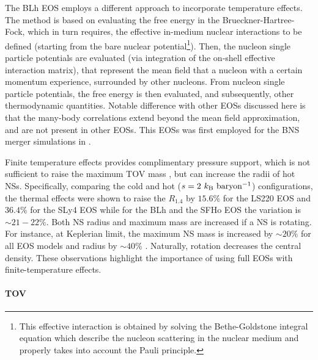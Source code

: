 The BLh \ac{EOS} employs a different approach to incorporate temperature effects.
The method is based on evaluating the free energy in the Brueckner-Hartree-Fock, which in turn requires,
the effective in-medium nuclear interactions to be defined (starting from the bare nuclear potential\footnote{
    This effective interaction is obtained by solving
    the Bethe-Goldstone integral equation which describe the nucleon 
    scattering in the nuclear medium and properly takes into
    account the Pauli principle.
}).
%
Then, the nucleon single particle potentials are evaluated (via integration of the on-shell effective interaction matrix),
that represent the mean field that a nucleon with a certain momentum experience, surrounded by other nucleons.
From nucleon single particle potentials, the free energy is then evaluated, and subsequently, 
other thermodynamic quantities. Notable difference with other \acp{EOS} discussed here is that the many-body 
correlations extend beyond the mean field approximation, and are not present in other \acp{EOS}. 
This \acp{EOS} was first employed for the \ac{BNS} merger simulations in \citet{Bernuzzi:2020txg}.

Finite temperature effects provides complimentary pressure support,
which is not sufficient to raise the maximum \ac{TOV} mass 
\citep{Kaplan:2013wra}, but can increase the radii of hot \acp{NS}.
Specifically, comparing the cold and hot ($s=2~{k_{\rm B}~{\rm baryon^{-1}}}$)
configurations, the thermal effects were shown to raise the $R_{1.4}$
by $15.6 \%$ for the LS220 EOS and $36.4 \%$ for the SLy4 EOS 
while for the BLh and the SFHo EOS the variation is $\sim 21-22 \%$.
%
Both \ac{NS} radius and maximum mass are increased if a \ac{NS} is rotating. 
For instance, at Keplerian limit, the maximum \ac{NS} mass is increased by 
$\sim 20\%$ for all \ac{EOS} models and radius by $\sim 40\%$ \citep{Bernuzzi:2020txg}. 
Naturally, rotation decreases the central density.
%
These observations highlight the importance of using full \acp{EOS} with finite-temperature effects. 


\paragraph{TOV}


